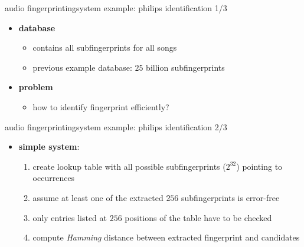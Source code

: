         \begin{frame}{audio fingerprinting}{system example: philips identification 1/3}
            \begin{itemize}
                \item	\textbf{database}
                    \begin{itemize}
                        \item	contains all subfingerprints for all songs
                        \item<2->	previous example database: $25$ billion subfingerprints
                        \bigskip
                    \end{itemize}
                \item<3->	\textbf{problem}
                    \begin{itemize}
                        \item how to identify fingerprint efficiently?
                    \end{itemize}
            \end{itemize}
        \end{frame}
        
        \begin{frame}{audio fingerprinting}{system example: philips identification 2/3}
            \begin{itemize}
                \item \textbf{simple system}:
                    \begin{enumerate}
                        \item	create lookup table with all possible subfingerprints ($2^{32}$) pointing to occurrences
                        \bigskip
                        \item<2->	assume at least one of the extracted $256$ subfingerprints is error-free\\
                        \item<2->[$\Rightarrow$] only entries listed at $256$ positions of the table have to be checked
                        \bigskip
                        \item<3->	compute \textit{Hamming} distance between extracted fingerprint and candidates
                    \end{enumerate}
            \end{itemize}
        \end{frame}
        
